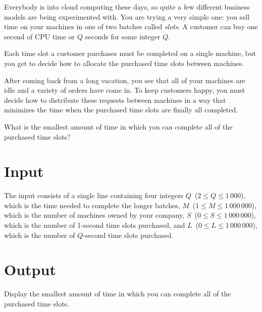 


Everybody is into cloud computing these days, so quite a few different business models are being experimented with. You are trying a very simple one: you sell time on your machines in one of two batches called {\em slots}. A customer can buy one second of CPU time or $Q$ seconds for some integer $Q$.

Each time slot a customer purchases must be completed on a single machine, but you get to decide how to allocate the purchased time slots between machines.

After coming back from a long vacation, you see that all of your machines are idle and a variety of orders have come in. To keep customers happy, you must decide how to distribute these requests between machines in a way that minimizes the time when the purchased time slots are finally all completed.

What is the smallest amount of time in which you can complete all of the purchased time slots?

\section*{Input}

The input consists of a single line containing four integers $Q$~($2 \leq Q \leq 1\,000$), which is the time needed to complete the longer batches, $M$~($1 \leq M \leq 1\,000\,000$), which is the number of machines owned by your company, $S$~($0 \leq S \leq 1\,000\,000$), which is the number of 1-second time slots purchased, and $L$~($0 \leq L \leq 1\,000\,000$), which is the number of $Q$-second time slots purchased.

\section*{Output}

Display the smallest amount of time in which you can complete all of the purchased time slots.
